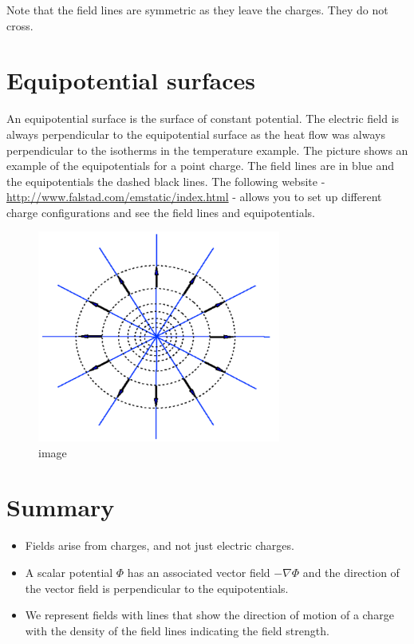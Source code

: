 \documentclass[
]{book}
\begin{document}
Note that the field lines are symmetric as they leave the charges. They
do not cross.

\hypertarget{equipotential-surfaces}{%
\section{Equipotential surfaces}\label{equipotential-surfaces}}

An equipotential surface is the surface of constant potential. The
electric field is always perpendicular to the equipotential surface as
the heat flow was always perpendicular to the isotherms in the
temperature example. The picture shows an example of the equipotentials
for a point charge. The field lines are in blue and the equipotentials
the dashed black lines. The following website -
\url{http://www.falstad.com/emstatic/index.html} - allows you to set up
different charge configurations and see the field lines and
equipotentials.

\begin{figure}
\centering
\includegraphics[width=80mm,height=\textheight]{Figures/equipotentials.png}
\caption{image}
\end{figure}

\hypertarget{summary}{%
\section{Summary}\label{summary}}

\begin{itemize}
\item
  Fields arise from charges, and not just electric charges.
\item
  A scalar potential \(\Phi\) has an associated vector field
  \(-\nabla \Phi\) and the direction of the vector field is
  perpendicular to the equipotentials.
\item
  We represent fields with lines that show the direction of motion of
  a charge with the density of the field lines indicating the field
  strength.
\end{itemize}
\end{document}
